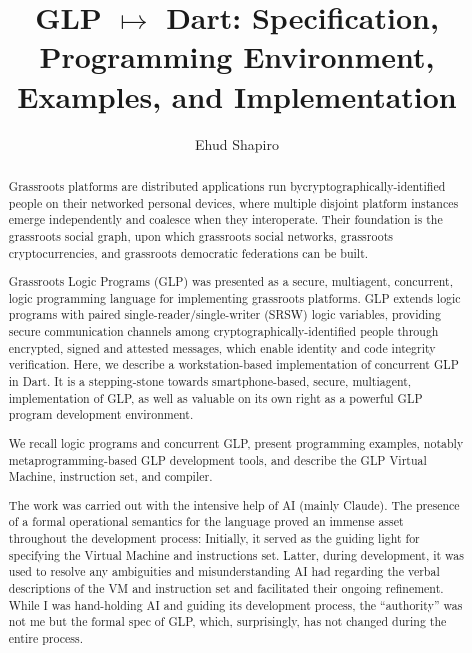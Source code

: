 \documentclass[runningheads,thm-restate]{llncs}
\begin{document}
\title{\smaller GLP $\mapsto$ Dart:  Specification, Programming Environment, Examples, and Implementation}
\author{Ehud Shapiro}

\maketitle

\begin{abstract}
Grassroots platforms are distributed applications run by\linebreak  cryptographically-identified people on their networked personal devices, where multiple disjoint platform instances emerge independently and coalesce when they interoperate. Their foundation is the grassroots social graph, upon which grassroots social networks, grassroots cryptocurrencies, and grassroots democratic federations can be built.

Grassroots Logic Programs (GLP) was presented as a secure, multiagent, concurrent, logic programming language for implementing grassroots platforms. GLP extends logic programs with paired single-reader/single-writer (SRSW) logic variables, providing secure communication channels among cryptographically-identified people through encrypted, signed and attested messages, which enable identity and code integrity verification.  
Here, we describe a workstation-based implementation of concurrent GLP in Dart.  It is a stepping-stone towards smartphone-based, secure, multiagent, implementation of GLP, as well as valuable on its own right as a powerful GLP program development environment.

We recall logic programs and  concurrent GLP, present programming examples,  notably metaprogramming-based GLP development tools, and describe the GLP Virtual Machine, instruction set, and compiler.

The work was carried out with the intensive help of AI (mainly Claude).  The presence of a formal operational semantics for the language proved an immense asset throughout the development process: Initially, it served as the guiding light for specifying the Virtual Machine and instructions set.  Latter, during development, it was used to resolve any ambiguities and misunderstanding AI had regarding the verbal descriptions of the VM and instruction set and facilitated their ongoing refinement.  While I was hand-holding AI and guiding its development process, the ``authority'' was not me but the formal spec of GLP, which, surprisingly, has not changed during the entire process.
\end{abstract}
\end{document}
